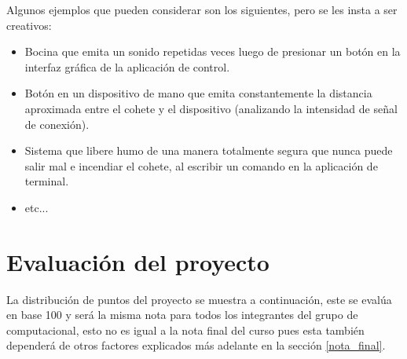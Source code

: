 ﻿\documentclass[letterpaper]{article}
\begin{document}
Algunos ejemplos que pueden considerar son los siguientes, pero se les insta a ser creativos:
\begin{itemize}
    \item Bocina que emita un sonido repetidas veces luego de presionar un botón en la interfaz
        gráfica de la aplicación de control.
    \item Botón en un dispositivo de mano que emita constantemente la distancia aproximada entre
        el cohete y el dispositivo (analizando la intensidad de señal de conexión).
    \item Sistema que libere humo de una manera totalmente segura que nunca puede salir mal e
        incendiar el cohete, al escribir un comando en la aplicación de terminal.
    \item etc...
\end{itemize}

\section{Evaluación del proyecto}
La distribución de puntos del proyecto se muestra a continuación, este se evalúa en base 100 y será
la misma nota para todos los integrantes del grupo de computacional, esto no es igual a la nota
final del curso pues esta también dependerá de otros factores explicados más adelante en la sección 
\ref{nota_final}.
\end{document}
